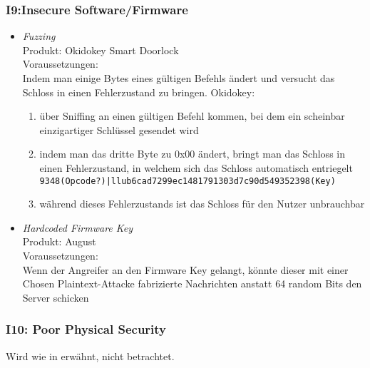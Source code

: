    \subsubsection*{I9:Insecure Software/Firmware}
        \begin{itemize}[leftmargin=0cm,label={}]
            \item \emph{Fuzzing}\cite{Rose2016}\label{vuln:fuzzing}\\
                Produkt: Okidokey Smart Doorlock\\
                Voraussetzungen: \\  
                Indem man einige Bytes eines gültigen Befehls ändert und versucht das Schloss in einen Fehlerzustand zu bringen. 
    	        Okidokey:
    	        \begin{enumerate}[noitemsep]
    	            \item über Sniffing an einen gültigen Befehl kommen, bei dem ein scheinbar einzigartiger Schlüssel gesendet wird
    	            \item indem man das dritte Byte zu 0x00 ändert, bringt man das Schloss in einen Fehlerzustand, in welchem sich das Schloss automatisch entriegelt\\
    	            \lstinline{9348(Opcode?)|llub6cad7299ec1481791303d7c90d549352398(Key)}
    	            \item während dieses Fehlerzustands ist das Schloss für den Nutzer unbrauchbar
    	        \end{enumerate} 
	        \item \emph{Hardcoded Firmware Key}\cite{Fuller2017}\label{vuln:firmware_key}\\
                Produkt: August\\
                Voraussetzungen: \\
                Wenn der Angreifer an den Firmware Key gelangt, könnte dieser mit einer Chosen Plaintext-Attacke fabrizierte Nachrichten anstatt 64 random Bits den Server schicken
        \end{itemize}
        
    \subsubsection*{I10: Poor Physical Security}
        Wird wie in  erwähnt, nicht betrachtet.
    